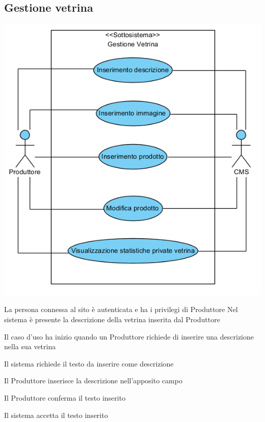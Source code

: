 \subsection{Gestione vetrina}
\begin{center}
   \includegraphics[width=\textwidth]{assets/visualParadigm/GestioneVentrina}
\end{center}
%
{}
{La persona connessa al sito è autenticata e ha i privilegi di Produttore}
{Nel sistema è presente la descrizione della vetrina inserita dal Produttore}
{\begin{enumCU}
		\item Il caso d'uso ha inizio quando un Produttore richiede di inserire una descrizione nella sua vetrina
		\item Il sistema richiede il testo da inserire come descrizione \label{cuinsdescr:2}
		\item Il Produttore inserisce la descrizione nell'apposito campo \label{cuinsdescr:3}
		\item Il Produttore conferma il testo inserito
		\item Il sistema accetta il testo inserito
	\end{enumCU}}
